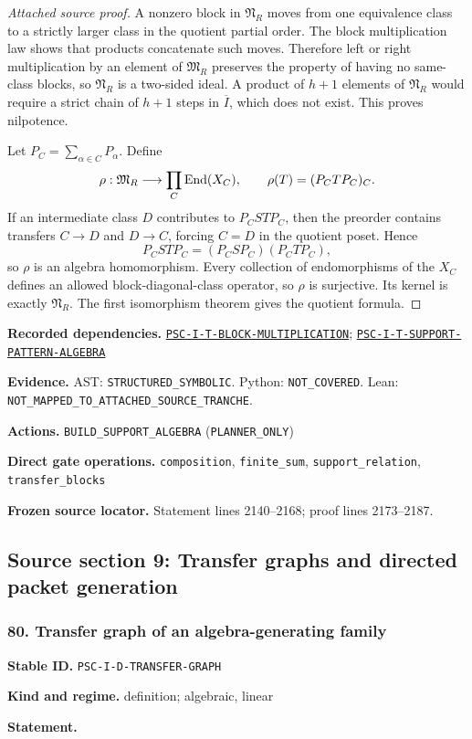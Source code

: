 \documentclass[a4paper,11pt]{article}
\newcommand{\field}[2]{\noindent\textbf{#1.} #2\par}
\begin{document}
\begin{proof}[Attached source proof]
A nonzero block in $\mathfrak N_R$ moves from one equivalence class to a strictly larger class in the quotient partial order.  The block multiplication law shows that products concatenate such moves.  Therefore left or right multiplication by an element of $\mathfrak M_R$ preserves the property of having no same-class blocks, so $\mathfrak N_R$ is a two-sided ideal.  A product of $h+1$ elements of $\mathfrak N_R$ would require a strict chain of $h+1$ steps in $\overline I$, which does not exist.  This proves nilpotence.

Let $P_C=\sum_{\alpha\in C}P_\alpha$.  Define
\[
\rho:\mathfrak M_R\longrightarrow\prod_C\operatorname{End}(X_C),
\qquad
\rho(T)=(P_CTP_C)_C.
\]
If an intermediate class $D$ contributes to $P_CSTP_C$, then the preorder contains transfers $C\to D$ and $D\to C$, forcing $C=D$ in the quotient poset.  Hence
\[
P_CSTP_C=(P_CSP_C)(P_CTP_C),
\]
so $\rho$ is an algebra homomorphism.  Every collection of endomorphisms of the $X_C$ defines an allowed block-diagonal-class operator, so $\rho$ is surjective.  Its kernel is exactly $\mathfrak N_R$.  The first isomorphism theorem gives the quotient formula.
\end{proof}
\field{Recorded dependencies}{\hyperref[rec:PSC-I-T-BLOCK-MULTIPLICATION]{\nolinkurl{PSC-I-T-BLOCK-MULTIPLICATION}}; \hyperref[rec:PSC-I-T-SUPPORT-PATTERN-ALGEBRA]{\nolinkurl{PSC-I-T-SUPPORT-PATTERN-ALGEBRA}}}
\field{Evidence}{AST: \nolinkurl{STRUCTURED_SYMBOLIC}. Python: \nolinkurl{NOT_COVERED}. Lean: \nolinkurl{NOT_MAPPED_TO_ATTACHED_SOURCE_TRANCHE}.}
\field{Actions}{\nolinkurl{BUILD_SUPPORT_ALGEBRA} (\nolinkurl{PLANNER_ONLY})}
\field{Direct gate operations}{\nolinkurl{composition}, \nolinkurl{finite_sum}, \nolinkurl{support_relation}, \nolinkurl{transfer_blocks}}
\field{Frozen source locator}{Statement lines 2140--2168; proof lines 2173--2187.}
\clearpage\subsection{Source section 9: Transfer graphs and directed packet generation}
\subsubsection*{80. Transfer graph of an algebra-generating family}
\label{rec:PSC-I-D-TRANSFER-GRAPH}
\field{Stable ID}{\nolinkurl{PSC-I-D-TRANSFER-GRAPH}}
\field{Kind and regime}{definition; algebraic, linear}
\textbf{Statement.}\par
\end{document}
